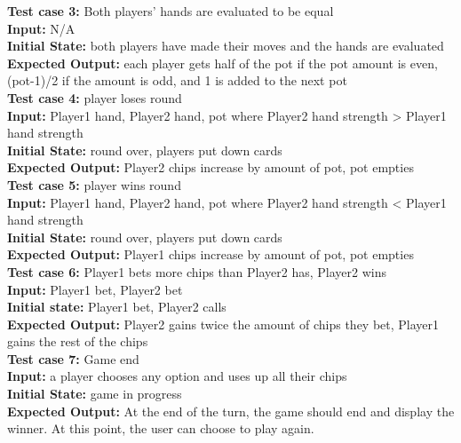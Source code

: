 \documentclass[12pt]{article}
\begin{document}
    \noindent \textbf{Test case 3:} Both players' hands are evaluated to be equal\\
    \textbf{Input:} N/A\\
    \textbf{Initial State:} both players have made their moves and the hands are evaluated\\
	\textbf{Expected Output:} each player gets half of the pot if the pot amount is even, (pot-1)/2 if the amount is odd, and 1 is added to the next pot\\

    \noindent \textbf{Test case 4:} player loses round\\
    \textbf{Input:} Player1 hand, Player2 hand, pot where Player2 hand strength > Player1 hand 
    strength\\
    \textbf{Initial State:} round over, players put down cards\\
    \textbf{Expected Output:} Player2 chips increase by amount of pot, pot empties\\

    \noindent \textbf{Test case 5:} player wins round\\
    \textbf{Input:} Player1 hand, Player2 hand, pot where Player2 hand strength < Player1 hand 
    strength\\
    \textbf{Initial State:} round over, players put down cards\\
    \textbf{Expected Output:} Player1 chips increase by amount of pot, pot empties\\

    \noindent \textbf{Test case 6:} Player1 bets more chips than Player2 has, Player2 wins\\
    \textbf{Input:} Player1 bet, Player2 bet\\
    \textbf{Initial state:} Player1 bet, Player2 calls\\
    \textbf{Expected Output:} Player2 gains twice the amount of chips they bet, Player1 gains the
    rest of the chips\\

    \noindent \textbf{Test case 7:} Game end\\
	\textbf{Input:} a player chooses any option and uses up all their chips\\
	\textbf{Initial State:} game in progress\\
	\textbf{Expected Output:} At the end of the turn, the game should end and display the winner. At this point, the user can choose to play again. \\
\end{document}
